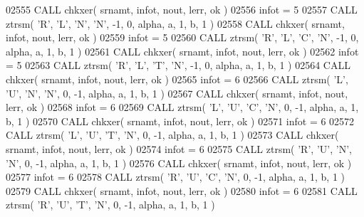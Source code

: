 \begin{DoxyCode}
02555       \textcolor{keyword}{CALL }chkxer( srnamt, infot, nout, lerr, ok )
02556       infot = 5
02557       \textcolor{keyword}{CALL }ztrsm( \textcolor{stringliteral}{'R'}, \textcolor{stringliteral}{'L'}, \textcolor{stringliteral}{'N'}, \textcolor{stringliteral}{'N'}, -1, 0, alpha, a, 1, b, 1 )
02558       \textcolor{keyword}{CALL }chkxer( srnamt, infot, nout, lerr, ok )
02559       infot = 5
02560       \textcolor{keyword}{CALL }ztrsm( \textcolor{stringliteral}{'R'}, \textcolor{stringliteral}{'L'}, \textcolor{stringliteral}{'C'}, \textcolor{stringliteral}{'N'}, -1, 0, alpha, a, 1, b, 1 )
02561       \textcolor{keyword}{CALL }chkxer( srnamt, infot, nout, lerr, ok )
02562       infot = 5
02563       \textcolor{keyword}{CALL }ztrsm( \textcolor{stringliteral}{'R'}, \textcolor{stringliteral}{'L'}, \textcolor{stringliteral}{'T'}, \textcolor{stringliteral}{'N'}, -1, 0, alpha, a, 1, b, 1 )
02564       \textcolor{keyword}{CALL }chkxer( srnamt, infot, nout, lerr, ok )
02565       infot = 6
02566       \textcolor{keyword}{CALL }ztrsm( \textcolor{stringliteral}{'L'}, \textcolor{stringliteral}{'U'}, \textcolor{stringliteral}{'N'}, \textcolor{stringliteral}{'N'}, 0, -1, alpha, a, 1, b, 1 )
02567       \textcolor{keyword}{CALL }chkxer( srnamt, infot, nout, lerr, ok )
02568       infot = 6
02569       \textcolor{keyword}{CALL }ztrsm( \textcolor{stringliteral}{'L'}, \textcolor{stringliteral}{'U'}, \textcolor{stringliteral}{'C'}, \textcolor{stringliteral}{'N'}, 0, -1, alpha, a, 1, b, 1 )
02570       \textcolor{keyword}{CALL }chkxer( srnamt, infot, nout, lerr, ok )
02571       infot = 6
02572       \textcolor{keyword}{CALL }ztrsm( \textcolor{stringliteral}{'L'}, \textcolor{stringliteral}{'U'}, \textcolor{stringliteral}{'T'}, \textcolor{stringliteral}{'N'}, 0, -1, alpha, a, 1, b, 1 )
02573       \textcolor{keyword}{CALL }chkxer( srnamt, infot, nout, lerr, ok )
02574       infot = 6
02575       \textcolor{keyword}{CALL }ztrsm( \textcolor{stringliteral}{'R'}, \textcolor{stringliteral}{'U'}, \textcolor{stringliteral}{'N'}, \textcolor{stringliteral}{'N'}, 0, -1, alpha, a, 1, b, 1 )
02576       \textcolor{keyword}{CALL }chkxer( srnamt, infot, nout, lerr, ok )
02577       infot = 6
02578       \textcolor{keyword}{CALL }ztrsm( \textcolor{stringliteral}{'R'}, \textcolor{stringliteral}{'U'}, \textcolor{stringliteral}{'C'}, \textcolor{stringliteral}{'N'}, 0, -1, alpha, a, 1, b, 1 )
02579       \textcolor{keyword}{CALL }chkxer( srnamt, infot, nout, lerr, ok )
02580       infot = 6
02581       \textcolor{keyword}{CALL }ztrsm( \textcolor{stringliteral}{'R'}, \textcolor{stringliteral}{'U'}, \textcolor{stringliteral}{'T'}, \textcolor{stringliteral}{'N'}, 0, -1, alpha, a, 1, b, 1 )

\end{DoxyCode}
